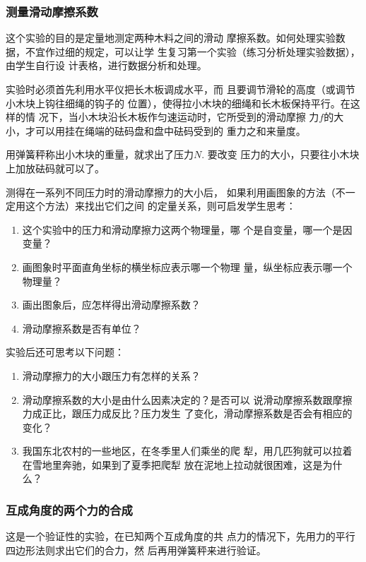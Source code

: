 \subsubsection{测量滑动摩擦系数}

这个实验的目的是定量地测定两种木料之间的滑动
摩擦系数。如何处理实验数据，不宜作过细的规定，可以让学
生复习第一个实验（练习分析处理实验数据），由学生自行设
计表格，进行数据分析和处理。

实验时必须首先利用水平仪把长木板调成水平，而
且要调节滑轮的高度（或调节小木块上钩往细绳的钩子的
位置），使得拉小木块的细绳和长木板保持平行。在这样的情
况下，当小木块沿长木板作匀速运动时，它所受到的滑动摩擦
力$f$的大小，才可以用挂在绳端的砝码盘和盘中砝码受到的
重力之和来量度。

用弹簧秤称出小木块的重量，就求出了压力$N$. 要改变
压力的大小，只要往小木块上加放砝码就可以了。

测得在一系列不同压力时的滑动摩擦力的大小后，
如果利用画图象的方法（不一定用这个方法）来找出它们之间
的定量关系，则可启发学生思考：
\begin{enumerate}
\item 这个实验中的压力和滑动摩擦力这两个物理量，哪
个是自变量，哪一个是因变量？
\item 画图象时平面直角坐标的横坐标应表示哪一个物理
量，纵坐标应表示哪一个物理量？
\item 画出图象后，应怎样得出滑动摩擦系数？
\item 滑动摩擦系数是否有单位？
\end{enumerate}

实验后还可思考以下问题：
\begin{enumerate}
    \item 滑动摩擦力的大小跟压力有怎样的关系？
    \item 滑动摩擦系数的大小是由什么因素决定的？是否可以
    说滑动摩擦系数跟摩擦力成正比，跟压力成反比？压力发生
    了变化，滑动摩擦系数是否会有相应的变化？
    \item 我国东北农村的一些地区，在冬季里人们乘坐的爬
    犁，用几匹狗就可以拉着在雪地里奔驰，如果到了夏季把爬犁
    放在泥地上拉动就很困难，这是为什么？
\end{enumerate}

\subsubsection{互成角度的两个力的合成}

这是一个验证性的实验，在已知两个互成角度的共
点力的情况下，先用力的平行四边形法则求出它们的合力，然
后再用弹簧秤来进行验证。


